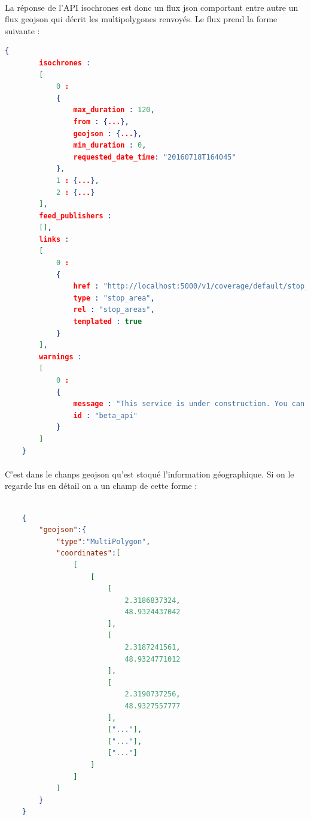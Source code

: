 \documentclass[a4paper]{report}
\begin{document}
\paragraph{} La réponse de l'API isochrones est donc un flux json comportant entre autre un flux geojson qui décrit les multipolygones renvoyés. Le flux prend la forme suivante :


\begin{lstlisting}[language=json,firstnumber=1]
    {
        isochrones :
        [
            0 :
            {
                max_duration : 120,
                from : {...},
                geojson : {...},
                min_duration : 0,
                requested_date_time: "20160718T164045"
            },
            1 : {...},
            2 : {...}
        ],
        feed_publishers :
        [],
        links :
        [
            0 :
            {
                href : "http://localhost:5000/v1/coverage/default/stop_areas/{stop_area.id}",
                type : "stop_area",
                rel : "stop_areas",
                templated : true
            }
        ],
        warnings :
        [
            0 :
            {
                message : "This service is under construction. You can help through github.com/CanalTP/navitia",
                id : "beta_api"
            }
        ]
    }

\end{lstlisting}

\paragraph{} C'est dans le chanps geojson qu'est stoqué l'information géographique. Si on le regarde lus en détail on a un champ de cette forme :


\begin{lstlisting}[language=json,firstnumber=1]

    {
        "geojson":{
            "type":"MultiPolygon",
            "coordinates":[
                [
                    [
                        [
                            2.3186837324,
                            48.9324437042
                        ],
                        [
                            2.3187241561,
                            48.9324771012
                        ],
                        [
                            2.3190737256,
                            48.9327557777
                        ],
                        ["..."],
                        ["..."],
                        ["..."]
                    ]
                ]
            ]
        }
    }
\end{lstlisting}
\end{document}

